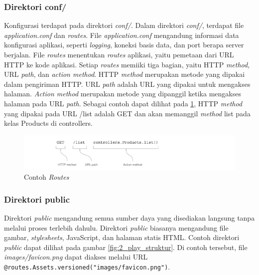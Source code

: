 \subsubsection{Direktori conf/}
Konfigurasi \play terdapat pada direktori \textit{conf/}. Dalam direktori \textit{conf/}, terdapat file \textit{application.conf} dan \textit{routes}. File \textit{application.conf} mengandung informasi data konfigurasi aplikasi, seperti \textit{logging}, koneksi basis data, dan port berapa server berjalan. File \textit{routes} menentukan \textit{routes} aplikasi, yaitu pemetaan dari URL HTTP ke kode aplikasi. Setiap \textit{routes} memiiki tiga bagian, yaitu HTTP \textit{method}, URL \textit{path}, dan \textit{action method}. HTTP \textit{method} merupakan metode yang dipakai dalam pengiriman HTTP. URL \textit{path} adalah URL yang dipakai untuk mengakses halaman. \textit{Action method} merupakan metode  yang dipanggil ketika mengakses halaman pada URL \textit{path}. Sebagai contoh dapat dilihat pada \ref{fig:2_play_routes}, HTTP \textit{method} yang dipakai pada URL /list adalah GET dan akan memanggil \textit{method} list pada kelas Products di controllers.

\begin{figure}[H]
	\centering
	\includegraphics[scale=0.7]{Gambar/play-routes}
	\caption{Contoh \textit{Routes} \cite{playforjava}} 
	\label{fig:2_play_routes}
\end{figure}

\subsubsection{Direktori public}
Direktori \textit{public} mengandung semua sumber daya yang disediakan langsung tanpa melalui proses terlebih dahulu. Direktori \textit{public} biasanya mengandung file gambar, \textit{stylesheets}, JavaScript, dan halaman statis HTML. Contoh direktori \textit{public} dapat dilihat pada gambar \ref{fig:2_play_struktur}. Di contoh tersebut, file \textit{images/favicon.png} dapat diakses melalui URL \verb!@routes.Assets.versioned("images/favicon.png")!. 
%

